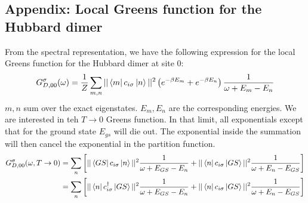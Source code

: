 \documentclass{report}
\numberwithin{equation}{section}
\begin{document}
\begin{appendices}
\section*{Appendix: Local Greens function for the Hubbard dimer}
From the spectral representation, we have the following expression for the local Greens function for the Hubbard dimer at site $0$:
\begin{equation}\begin{aligned}
	G_{D,00}^\sigma(\omega) = \frac{1}{Z}\sum_{m,n}||\bra{m}c_{i\sigma}\ket{n}||^2\left( e^{-\beta E_m} + e^{-\beta E_n}\right)\frac{1}{\omega + E_m - E_n}
\end{aligned}\end{equation}
$m,n$ sum over the exact eigenstates. $E_m, E_n$ are the corresponding energies. We are interested in teh $T \to 0$ Greens function. In that limit, all exponentials except that for the ground state $E_{gs}$ will die out. The exponential inside the summation will then cancel the exponential in the partition function.
\begin{equation}\begin{aligned}
	G_{D,00}^\sigma(\omega, T \to 0) &= \sum_{n}\left[||\bra{GS}c_{i\sigma}\ket{n}||^2\frac{1}{\omega + E_{GS} - E_n} + ||\bra{n}c_{i\sigma}\ket{GS}||^2\frac{1}{\omega + E_n - E_{GS}}\right]\\
					&= \sum_{n}\left[||\bra{n}c^\dagger_{i\sigma}\ket{GS}||^2\frac{1}{\omega + E_{GS} - E_n} + ||\bra{n}c_{i\sigma}\ket{GS}||^2\frac{1}{\omega + E_n - E_{GS}}\right]\\
\end{aligned}\end{equation}


\end{appendices}
\end{document}
